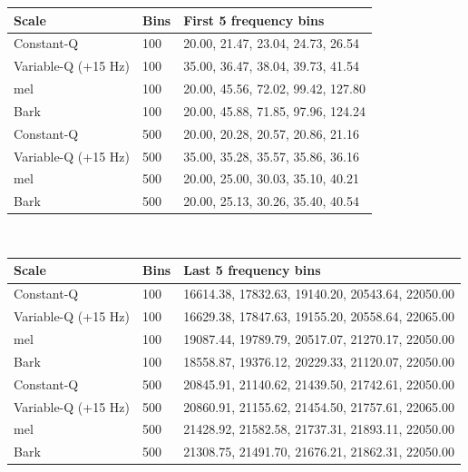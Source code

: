 \documentclass[report.tex]{subfiles}
\begin{document}
\begin{table}[ht]
	\centering
\begin{tabular}{ |l|l|p{9cm}| }
	 \hline
	 Scale & Bins & First 5 frequency bins \\
	 \hline
	 \hline
	 Constant-Q & 100 & 20.00, 21.47, 23.04, 24.73, 26.54 \\
	 \hline
	 Variable-Q (+15 Hz) & 100 & 35.00, 36.47, 38.04, 39.73, 41.54 \\
	 \hline
	 mel & 100 & 20.00, 45.56, 72.02, 99.42, 127.80 \\
	 \hline
	 Bark & 100 & 20.00, 45.88, 71.85, 97.96, 124.24 \\
	 \hline
	 Constant-Q & 500 & 20.00, 20.28, 20.57, 20.86, 21.16 \\
	 \hline
	 Variable-Q (+15 Hz) & 500 & 35.00, 35.28, 35.57, 35.86, 36.16 \\
	 \hline
	 mel & 500 & 20.00, 25.00, 30.03, 35.10, 40.21 \\
	 \hline
	 Bark & 500 & 20.00, 25.13, 30.26, 35.40, 40.54 \\
	 \hline
\end{tabular}\\
\vspace{1em}
\begin{tabular}{ |l|l|p{9cm}| }
	 \hline
	 Scale & Bins & Last 5 frequency bins \\
	 \hline
	 \hline
	 Constant-Q & 100 & 16614.38, 17832.63, 19140.20, 20543.64, 22050.00 \\
	 \hline
	 Variable-Q (+15 Hz) & 100 & 16629.38, 17847.63, 19155.20, 20558.64, 22065.00 \\
	 \hline
	 mel & 100 & 19087.44, 19789.79, 20517.07, 21270.17, 22050.00 \\
	 \hline
	 Bark & 100 & 18558.87, 19376.12, 20229.33, 21120.07, 22050.00 \\
	 \hline
	 Constant-Q & 500 & 20845.91, 21140.62, 21439.50, 21742.61, 22050.00 \\
	 \hline
	 Variable-Q (+15 Hz) & 500 & 20860.91, 21155.62, 21454.50, 21757.61, 22065.00 \\
	 \hline
	 mel & 500 & 21428.92, 21582.58, 21737.31, 21893.11, 22050.00 \\
	 \hline
	 Bark & 500 & 21308.75, 21491.70, 21676.21, 21862.31, 22050.00 \\
	 \hline
\end{tabular}\\
\vspace{1em}
\begin{tabular}{ |l|l|p{9cm}| }

\end{tabular}
\end{table}
\end{document}
